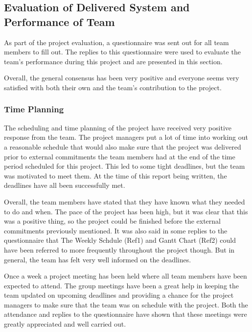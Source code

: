 \documentclass[a4paper]{article}
\begin{document}
\subsection{Evaluation of Delivered System and Performance of Team}
\label{sec:teval}
As part of the project evaluation, a questionnaire was sent out for all team members to fill out. The replies to this questionnaire were used to evaluate the team's performance during this project and are presented in this section. 

Overall, the general consensus has been very positive and everyone seems very satisfied with both their own and the team's contribution to the project.



\subsubsection{Time Planning}
The scheduling and time planning of the project have received very positive response from the team. The project managers put a lot of time into working out a reasonable schedule that would also make sure that the project was delivered prior to external commitments the team members had at the end of the time period scheduled for this project. This led to some tight deadlines, but the team was motivated to meet them. At the time of this report being written, the deadlines have all been successfully met. 

Overall, the team members have stated that they have known what they needed to do and when. The pace of the project has been high, but it was clear that this was a positive thing, so the project could be finished before the external commitments previously mentioned. It was also said in some replies to the questionnaire that The Weekly Schdule (Ref1) and Gantt Chart (Ref2) could have been referred to more frequently throughout the project though. But in general, the team has felt very well informed on the deadlines.

Once a week a project meeting has been held where all team members have been expected to attend. The group meetings have been a great help in keeping the team updated on upcoming deadlines and providing a chance for the project managers to make sure that the team was on schedule with the project. Both the attendance and replies to the questionnaire have shown that these meetings were greatly appreciated and well carried out.
\end{document}
